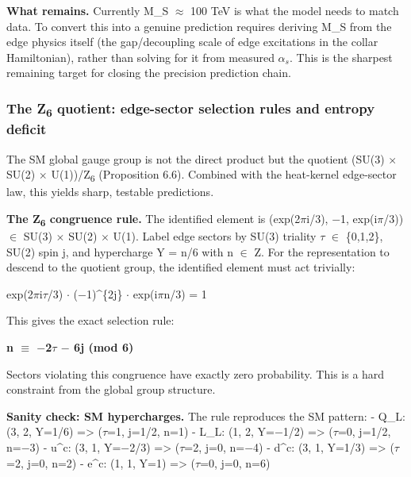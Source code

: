 \documentclass[11pt,a4paper]{article}
\theoremstyle{remark}
\begin{document}
\textbf{What remains.} Currently M\_S \ensuremath{\approx} 100 TeV is what the model needs to match data. To convert this into a genuine prediction requires deriving M\_S from the edge physics itself (the gap/decoupling scale of edge excitations in the collar Hamiltonian), rather than solving for it from measured $\alpha_s$. This is the sharpest remaining target for closing the precision prediction chain.

\subsubsection{The Z\textsubscript{6} quotient: edge-sector selection rules and entropy deficit}\label{the-zux2086-quotient-edge-sector-selection-rules-and-entropy-deficit}

The SM global gauge group is not the direct product but the quotient
(SU(3) \ensuremath{\times} SU(2) \ensuremath{\times} U(1))/Z\textsubscript{6} (Proposition 6.6). Combined with
the heat-kernel edge-sector law, this yields sharp, testable predictions.

\textbf{The Z\textsubscript{6} congruence rule.} The identified element is (exp(2\ensuremath{\pi}i/3), \ensuremath{-}1, exp(i\ensuremath{\pi}/3)) \ensuremath{\in} SU(3) \ensuremath{\times} SU(2) \ensuremath{\times} U(1). Label edge sectors by SU(3) triality \ensuremath{\tau} \ensuremath{\in} \{0,1,2\}, SU(2) spin j, and hypercharge Y = n/6 with n \ensuremath{\in} Z. For the representation to descend to the quotient group, the identified element must act trivially:

exp(2\ensuremath{\pi}i\ensuremath{\tau}/3) \ensuremath{\cdot} (\ensuremath{-}1)\^{}\{2j\} \ensuremath{\cdot} exp(i\ensuremath{\pi}n/3) = 1

This gives the exact selection rule:

\textbf{n \ensuremath{\equiv} \ensuremath{-}2\ensuremath{\tau} \ensuremath{-} 6j (mod 6)}

Sectors violating this congruence have exactly zero probability. This is a
hard constraint from the global group structure.

\textbf{Sanity check: SM hypercharges.} The rule reproduces the SM pattern:
- Q\_L: (3, 2, Y=1/6) =\textgreater{} (\ensuremath{\tau}=1, j=1/2, n=1) \checkmark{}
- L\_L: (1, 2, Y=\ensuremath{-}1/2) =\textgreater{} (\ensuremath{\tau}=0, j=1/2, n=\ensuremath{-}3) \checkmark{}
- u\^{}c: (3, 1, Y=\ensuremath{-}2/3) =\textgreater{} (\ensuremath{\tau}=2, j=0, n=\ensuremath{-}4) \checkmark{}
- d\^{}c: (3, 1, Y=1/3) =\textgreater{} (\ensuremath{\tau}=2, j=0, n=2) \checkmark{}
- e\^{}c: (1, 1, Y=1) =\textgreater{} (\ensuremath{\tau}=0, j=0, n=6) \checkmark{}
\end{document}
